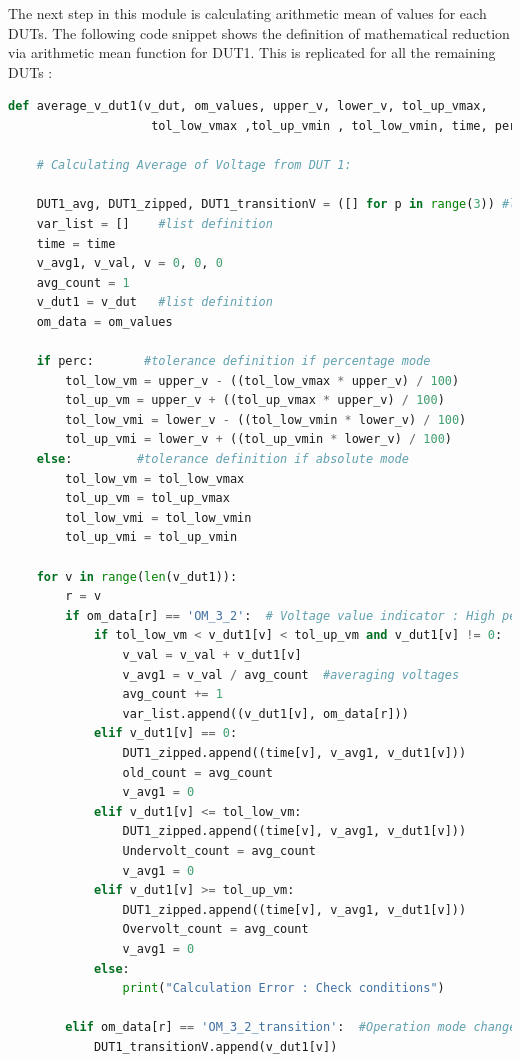 The next step in this module is calculating arithmetic mean of values for each DUTs. The following code snippet shows the definition of mathematical reduction via arithmetic mean function for DUT1. This is replicated for all the remaining DUTs :
\\
\begin{lstlisting}[language = Python]
def average_v_dut1(v_dut, om_values, upper_v, lower_v, tol_up_vmax,
                    tol_low_vmax ,tol_up_vmin , tol_low_vmin, time, perc):
 
    # Calculating Average of Voltage from DUT 1:
    
    DUT1_avg, DUT1_zipped, DUT1_transitionV = ([] for p in range(3)) #list definition
    var_list = []    #list definition
    time = time
    v_avg1, v_val, v = 0, 0, 0
    avg_count = 1
    v_dut1 = v_dut   #list definition
    om_data = om_values
 
    if perc:       #tolerance definition if percentage mode 
        tol_low_vm = upper_v - ((tol_low_vmax * upper_v) / 100)
        tol_up_vm = upper_v + ((tol_up_vmax * upper_v) / 100)
        tol_low_vmi = lower_v - ((tol_low_vmin * lower_v) / 100)
        tol_up_vmi = lower_v + ((tol_up_vmin * lower_v) / 100)
    else:         #tolerance definition if absolute mode
        tol_low_vm = tol_low_vmax
        tol_up_vm = tol_up_vmax
        tol_low_vmi = tol_low_vmin
        tol_up_vmi = tol_up_vmin
 
    for v in range(len(v_dut1)):
        r = v
        if om_data[r] == 'OM_3_2':  # Voltage value indicator : High performance mode
            if tol_low_vm < v_dut1[v] < tol_up_vm and v_dut1[v] != 0:
                v_val = v_val + v_dut1[v]
                v_avg1 = v_val / avg_count  #averaging voltages
                avg_count += 1
                var_list.append((v_dut1[v], om_data[r]))
            elif v_dut1[v] == 0:
                DUT1_zipped.append((time[v], v_avg1, v_dut1[v]))
                old_count = avg_count
                v_avg1 = 0
            elif v_dut1[v] <= tol_low_vm:
                DUT1_zipped.append((time[v], v_avg1, v_dut1[v]))
                Undervolt_count = avg_count
                v_avg1 = 0
            elif v_dut1[v] >= tol_up_vm:
                DUT1_zipped.append((time[v], v_avg1, v_dut1[v]))
                Overvolt_count = avg_count
                v_avg1 = 0
            else:
                print("Calculation Error : Check conditions")
 
        elif om_data[r] == 'OM_3_2_transition':  #Operation mode change. No averaging here
            DUT1_transitionV.append(v_dut1[v])
 

\end{lstlisting}
